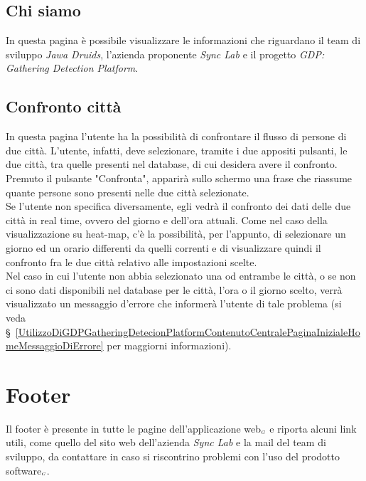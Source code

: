\subsection{Chi siamo} \label{UtilizzoDiGDPGatheringDetecionPlatformContenutoCentraleChiSiamo}
In questa pagina è possibile visualizzare le informazioni che riguardano il team di sviluppo \textit{Jawa Druids}, l'azienda proponente \textit{Sync Lab} e il progetto \textit{GDP: Gathering Detection Platform}.


\subsection{Confronto città} \label{UtilizzoDiGDPGatheringDetecionPlatformContenutoCentralePaginaInizialeHomeBottoneConfrontoCitta}
In questa pagina l'utente ha la possibilità di confrontare il flusso di persone di due città. L'utente, infatti, deve selezionare, tramite i due appositi pulsanti, le due città, tra quelle presenti nel database, di cui desidera avere il confronto. \\
 Premuto il pulsante "Confronta", apparirà sullo schermo una frase che riassume quante persone sono presenti nelle due città selezionate. \\
 Se l'utente non specifica diversamente, egli vedrà il confronto dei dati delle due città in real time, ovvero del giorno e dell'ora attuali. Come nel caso della visualizzazione su heat-map, c'è la possibilità, per l'appunto, di selezionare un giorno ed un orario differenti da quelli correnti e di visualizzare quindi il confronto fra le due città relativo alle impostazioni scelte. \\
 Nel caso in cui l'utente non abbia selezionato una od entrambe le città, o se non ci sono dati disponibili nel database per le città, l'ora o il giorno scelto, verrà visualizzato un messaggio d'errore che informerà l'utente di tale problema (si veda \S~\ref{UtilizzoDiGDPGatheringDetecionPlatformContenutoCentralePaginaInizialeHomeMessaggioDiErrore} per maggiorni informazioni).

\section{Footer}\label{UtilizzoDiGDPGatheringDetecionPlatformFooter}
Il footer è presente in tutte le pagine dell'applicazione web$_{\scaleto{G}{3pt}}$ e riporta alcuni link utili, come quello del sito web dell'azienda \textit{Sync Lab} e la mail del team di sviluppo, da contattare in caso si riscontrino problemi con l'uso del prodotto software$_{\scaleto{G}{3pt}}$.
